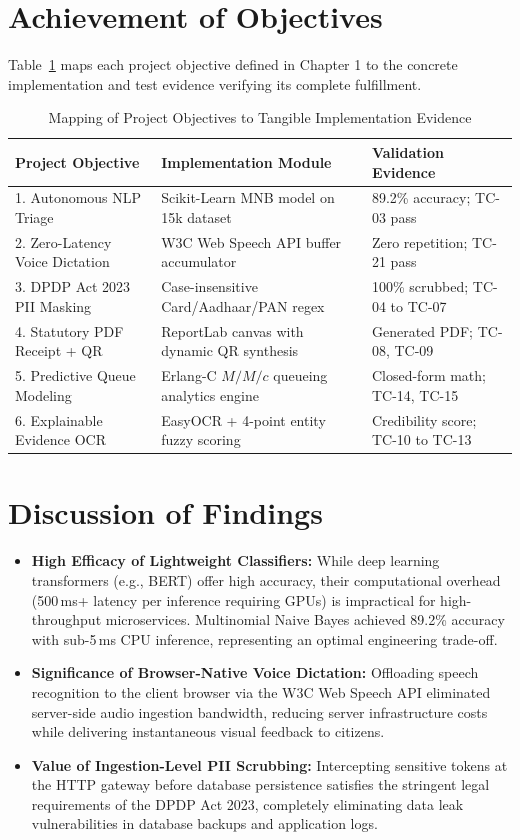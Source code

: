 \section{Achievement of Objectives}
Table~\ref{tab:objective_fulfillment} maps each project objective defined in Chapter 1 to the concrete implementation and test evidence verifying its complete fulfillment.

\begin{table}[h]
\centering
\caption{Mapping of Project Objectives to Tangible Implementation Evidence}
\label{tab:objective_fulfillment}
\begin{tabular}{|p{3.8cm}|p{5.5cm}|p{4.2cm}|}
\hline
\textbf{Project Objective} & \textbf{Implementation Module} & \textbf{Validation Evidence} \\ \hline
1. Autonomous NLP Triage & Scikit-Learn MNB model on 15k dataset & 89.2\% accuracy; TC-03 pass \\ \hline
2. Zero-Latency Voice Dictation & W3C Web Speech API buffer accumulator & Zero repetition; TC-21 pass \\ \hline
3. DPDP Act 2023 PII Masking & Case-insensitive Card/Aadhaar/PAN regex & 100\% scrubbed; TC-04 to TC-07 \\ \hline
4. Statutory PDF Receipt + QR & ReportLab canvas with dynamic QR synthesis & Generated PDF; TC-08, TC-09 \\ \hline
5. Predictive Queue Modeling & Erlang-C $M/M/c$ queueing analytics engine & Closed-form math; TC-14, TC-15 \\ \hline
6. Explainable Evidence OCR & EasyOCR + 4-point entity fuzzy scoring & Credibility score; TC-10 to TC-13 \\ \hline
\end{tabular}
\end{table}

\section{Discussion of Findings}
\begin{itemize}
    \item \textbf{High Efficacy of Lightweight Classifiers:} While deep learning transformers (e.g., BERT) offer high accuracy, their computational overhead (500\,ms+ latency per inference requiring GPUs) is impractical for high-throughput microservices. Multinomial Naive Bayes achieved 89.2\% accuracy with sub-5\,ms CPU inference, representing an optimal engineering trade-off.
    \item \textbf{Significance of Browser-Native Voice Dictation:} Offloading speech recognition to the client browser via the W3C Web Speech API eliminated server-side audio ingestion bandwidth, reducing server infrastructure costs while delivering instantaneous visual feedback to citizens.
    \item \textbf{Value of Ingestion-Level PII Scrubbing:} Intercepting sensitive tokens at the HTTP gateway before database persistence satisfies the stringent legal requirements of the DPDP Act 2023, completely eliminating data leak vulnerabilities in database backups and application logs.
\end{itemize}
